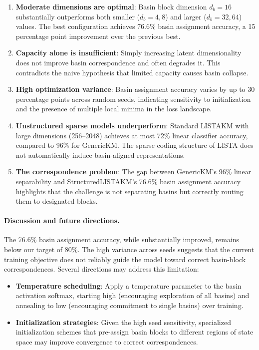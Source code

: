 \begin{enumerate}
    \item \textbf{Moderate dimensions are optimal}: Basin block dimension $d_b = 16$ substantially outperforms both smaller ($d_b = 4, 8$) and larger ($d_b = 32, 64$) values. The best configuration achieves 76.6\% basin assignment accuracy, a 15 percentage point improvement over the previous best.

    \item \textbf{Capacity alone is insufficient}: Simply increasing latent dimensionality does not improve basin correspondence and often degrades it. This contradicts the naive hypothesis that limited capacity causes basin collapse.

    \item \textbf{High optimization variance}: Basin assignment accuracy varies by up to 30 percentage points across random seeds, indicating sensitivity to initialization and the presence of multiple local minima in the loss landscape.

    \item \textbf{Unstructured sparse models underperform}: Standard LISTAKM with large dimensions (256--2048) achieves at most 72\% linear classifier accuracy, compared to 96\% for GenericKM. The sparse coding structure of LISTA does not automatically induce basin-aligned representations.

    \item \textbf{The correspondence problem}: The gap between GenericKM's 96\% linear separability and StructuredLISTAKM's 76.6\% basin assignment accuracy highlights that the challenge is not separating basins but correctly routing them to designated blocks.
\end{enumerate}

\paragraph{Discussion and future directions.}
The 76.6\% basin assignment accuracy, while substantially improved, remains below our target of 80\%. The high variance across seeds suggests that the current training objective does not reliably guide the model toward correct basin-block correspondences. Several directions may address this limitation:

\begin{itemize}
    \item \textbf{Temperature scheduling}: Apply a temperature parameter to the basin activation softmax, starting high (encouraging exploration of all basins) and annealing to low (encouraging commitment to single basins) over training.

    \item \textbf{Initialization strategies}: Given the high seed sensitivity, specialized initialization schemes that pre-assign basin blocks to different regions of state space may improve convergence to correct correspondences.
\end{itemize}

